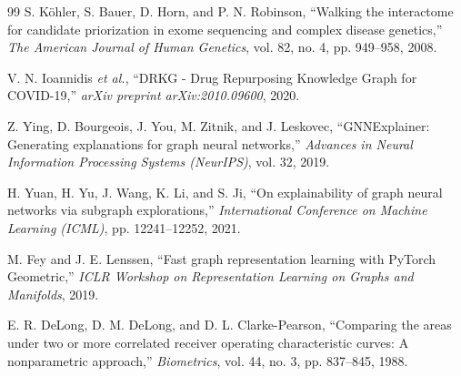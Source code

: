\documentclass[preprint,12pt]{elsarticle}
\begin{document}
\begin{thebibliography}{99}
 S. K{\"o}hler, S. Bauer, D. Horn, and P. N. Robinson, 
``Walking the interactome for candidate priorization in exome sequencing and complex disease genetics,''
\textit{The American Journal of Human Genetics}, vol. 82, no. 4, pp. 949--958, 2008.

 V. N. Ioannidis \textit{et al.}, 
``DRKG - Drug Repurposing Knowledge Graph for COVID-19,''
\textit{arXiv preprint arXiv:2010.09600}, 2020.

 Z. Ying, D. Bourgeois, J. You, M. Zitnik, and J. Leskovec, 
``GNNExplainer: Generating explanations for graph neural networks,''
\textit{Advances in Neural Information Processing Systems (NeurIPS)}, vol. 32, 2019.

 H. Yuan, H. Yu, J. Wang, K. Li, and S. Ji, 
``On explainability of graph neural networks via subgraph explorations,''
\textit{International Conference on Machine Learning (ICML)}, pp. 12241--12252, 2021.

 M. Fey and J. E. Lenssen, 
``Fast graph representation learning with PyTorch Geometric,''
\textit{ICLR Workshop on Representation Learning on Graphs and Manifolds}, 2019.

 E. R. DeLong, D. M. DeLong, and D. L. Clarke-Pearson,
``Comparing the areas under two or more correlated receiver operating characteristic curves: A nonparametric approach,''
\textit{Biometrics}, vol. 44, no. 3, pp. 837--845, 1988.

\end{thebibliography}
\end{document}
